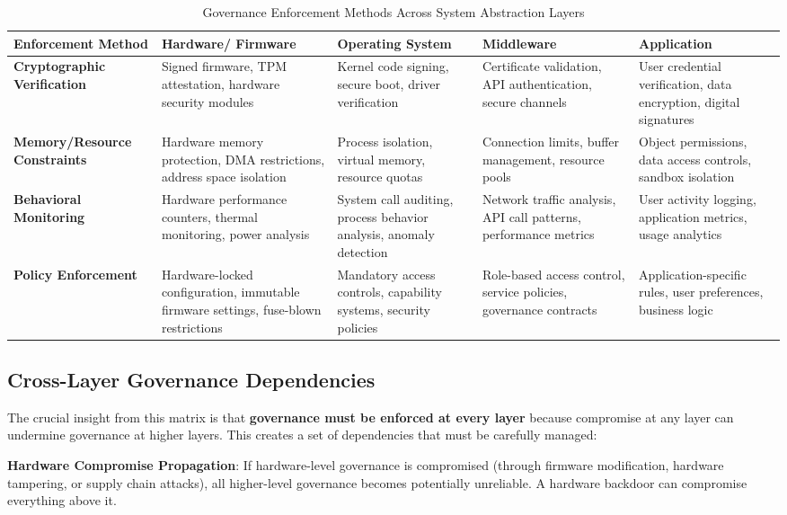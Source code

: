 \begin{table}[h]
\centering
\begin{tabular}{|p{3cm}|p{2.8cm}|p{2.8cm}|p{2.8cm}|p{2.8cm}|}
\hline
\textbf{Enforcement Method} & \textbf{Hardware/ Firmware} & \textbf{Operating System} & \textbf{Middleware} & \textbf{Application} \\
\hline
\textbf{Cryptographic Verification} & 
Signed firmware, TPM attestation, hardware security modules &
Kernel code signing, secure boot, driver verification &
Certificate validation, API authentication, secure channels &
User credential verification, data encryption, digital signatures \\
\hline
\textbf{Memory/Resource Constraints} &
Hardware memory protection, DMA restrictions, address space isolation &
Process isolation, virtual memory, resource quotas &
Connection limits, buffer management, resource pools &
Object permissions, data access controls, sandbox isolation \\
\hline
\textbf{Behavioral Monitoring} &
Hardware performance counters, thermal monitoring, power analysis &
System call auditing, process behavior analysis, anomaly detection &
Network traffic analysis, API call patterns, performance metrics &
User activity logging, application metrics, usage analytics \\
\hline
\textbf{Policy Enforcement} &
Hardware-locked configuration, immutable firmware settings, fuse-blown restrictions &
Mandatory access controls, capability systems, security policies &
Role-based access control, service policies, governance contracts &
Application-specific rules, user preferences, business logic \\
\hline
\end{tabular}
\caption{Governance Enforcement Methods Across System Abstraction Layers}
\label{tab:governance_enforcement_matrix}
\end{table}

\subsection{Cross-Layer Governance Dependencies}

The crucial insight from this matrix is that \textbf{governance must be enforced at every layer} because compromise at any layer can undermine governance at higher layers. This creates a set of dependencies that must be carefully managed:

\textbf{Hardware Compromise Propagation}: If hardware-level governance is compromised (through firmware modification, hardware tampering, or supply chain attacks), all higher-level governance becomes potentially unreliable. A hardware backdoor can compromise everything above it.


